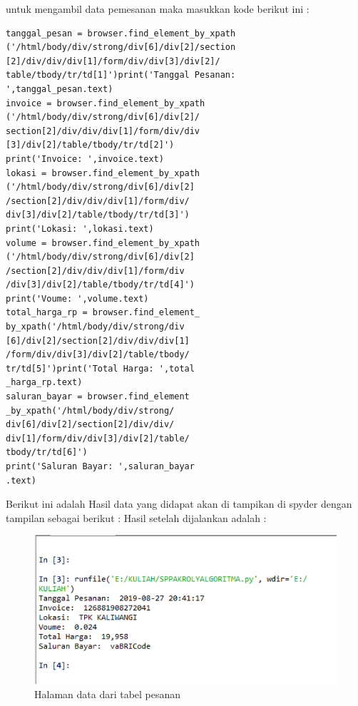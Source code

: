 untuk mengambil data pemesanan  maka masukkan kode berikut ini :
\begin{verbatim}
tanggal_pesan = browser.find_element_by_xpath
('/html/body/div/strong/div[6]/div[2]/section
[2]/div/div/div[1]/form/div/div[3]/div[2]/
table/tbody/tr/td[1]')print('Tanggal Pesanan:
',tanggal_pesan.text)
invoice = browser.find_element_by_xpath
('/html/body/div/strong/div[6]/div[2]/
section[2]/div/div/div[1]/form/div/div
[3]/div[2]/table/tbody/tr/td[2]')
print('Invoice: ',invoice.text)
lokasi = browser.find_element_by_xpath
('/html/body/div/strong/div[6]/div[2]
/section[2]/div/div/div[1]/form/div/
div[3]/div[2]/table/tbody/tr/td[3]')
print('Lokasi: ',lokasi.text)
volume = browser.find_element_by_xpath
('/html/body/div/strong/div[6]/div[2]
/section[2]/div/div/div[1]/form/div
/div[3]/div[2]/table/tbody/tr/td[4]')
print('Voume: ',volume.text)
total_harga_rp = browser.find_element_
by_xpath('/html/body/div/strong/div
[6]/div[2]/section[2]/div/div/div[1]
/form/div/div[3]/div[2]/table/tbody/
tr/td[5]')print('Total Harga: ',total
_harga_rp.text)
saluran_bayar = browser.find_element
_by_xpath('/html/body/div/strong/
div[6]/div[2]/section[2]/div/div/
div[1]/form/div/div[3]/div[2]/table/
tbody/tr/td[6]')
print('Saluran Bayar: ',saluran_bayar
.text)
\end{verbatim}

Berikut ini adalah Hasil data yang didapat 
akan di tampikan di spyder dengan tampilan sebagai berikut :
Hasil setelah dijalankan adalah :
\begin{figure}[h]
	\centering
	\includegraphics[scale=0.6]{figures/2tabelpesanan}
	\caption{Halaman data dari tabel pesanan}
\end{figure}